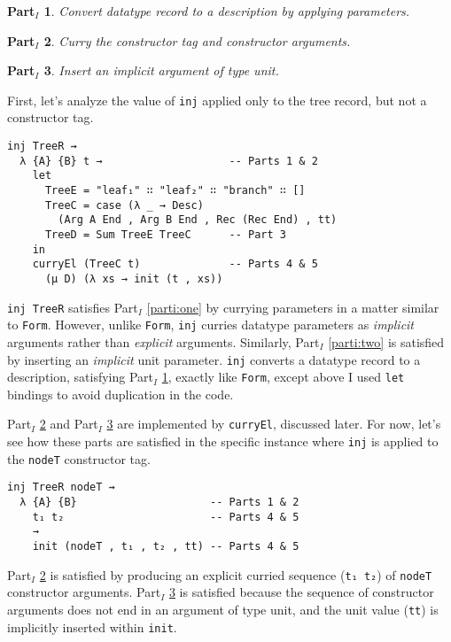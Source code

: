 \documentclass[runningheads,a4paper]{llncs}
\newtheorem{myparti}{Part$_I$}
\newcommand{\refparti}[1]{Part$_I$ \ref{parti:#1}}
\begin{document}
\begin{myparti}
\label{parti:three}
Convert datatype record to a description by applying parameters.
\end{myparti}

\begin{myparti}
\label{parti:four}
Curry the constructor tag and constructor arguments.
\end{myparti}

\begin{myparti}
\label{parti:five}
Insert an implicit argument of type unit.
\end{myparti}

First, let's analyze the value of {\tt inj} applied only to
the tree record, but not a constructor tag.

\begin{verbatim}
inj TreeR ⇝
  λ {A} {B} t →                    -- Parts 1 & 2
    let
      TreeE = "leaf₁" ∷ "leaf₂" ∷ "branch" ∷ []
      TreeC = case (λ _ → Desc)
        (Arg A End , Arg B End , Rec (Rec End) , tt)
      TreeD = Sum TreeE TreeC      -- Part 3
    in
    curryEl (TreeC t)              -- Parts 4 & 5
      (μ D) (λ xs → init (t , xs))
\end{verbatim}

{\tt inj TreeR} satisfies \refparti{one} by currying parameters
in a matter similar to {\tt Form}. However, unlike {\tt Form},
{\tt inj} curries datatype parameters as {\it implicit}
arguments rather than {\it explicit} arguments. Similarly,
\refparti{two} is satisfied by inserting an {\it implicit} unit
parameter. {\tt inj} converts a datatype record to a description,
satisfying \refparti{three},
exactly like {\tt Form}, except above I used
{\tt let} bindings to avoid duplication in the code.

\refparti{four} and \refparti{five} are implemented by {\tt curryEl},
discussed later. For now, let's see how these parts are satisfied in
the specific instance where {\tt inj} is applied to the
{\tt nodeT} constructor tag.

\begin{verbatim}
inj TreeR nodeT ⇝
  λ {A} {B}                     -- Parts 1 & 2
    t₁ t₂                       -- Parts 4 & 5
    →
    init (nodeT , t₁ , t₂ , tt) -- Parts 4 & 5
\end{verbatim}

\refparti{four} is satisfied by producing an explicit curried sequence
({\tt t₁ t₂}) of {\tt nodeT} constructor arguments. \refparti{five} is satisfied
because the sequence of constructor arguments does not end in an
argument of type unit, and the unit value ({\tt tt}) is implicitly
inserted within {\tt init}.
\end{document}
